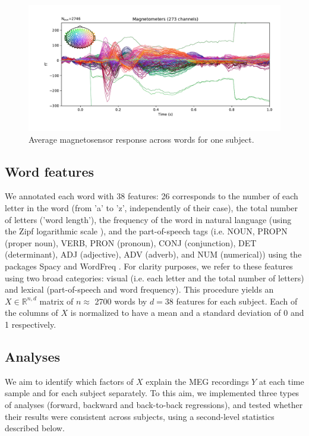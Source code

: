 \begin{figure}
  \centering
  \includegraphics[width=\textwidth, trim=1.5cm 1cm 0.5cm 0cm, clip=True]{figure_meg.pdf}
  \caption{Average magnetosensor response across words for one subject.}
  \label{fig:megavg}
\end{figure}

\subsection{Word features}
We annotated each word with 38 features: 26 corresponds to the number of each letter in the word (from 'a' to 'z', independently of their case), the total number of letters ('word length'), the frequency of the word in natural language (using the Zipf logarithmic scale \cite{marc_brysbaert}), and the part-of-speech tags (i.e. NOUN, PROPN (proper noun), VERB, PRON (pronoun), CONJ (conjunction), DET (determinant), ADJ (adjective), ADV (adverb), and NUM (numerical)) using the packages Spacy \cite{spacy} and WordFreq \cite{speer}. For clarity purposes, we refer to these features using two broad categories: visual (i.e. each letter and the total number of letters) and lexical (part-of-speech and word frequency).
This procedure yields an $X \in \mathbb{R}^{n, d}$ matrix of $n\approx$ 2700 words by $d=38$ features for each subject. Each of the columns of $X$ is normalized to have a mean and a standard deviation of 0 and 1 respectively.

\subsection{Analyses}
We aim to identify which factors of $X$ explain the MEG recordings $Y$ at each time sample and for each subject separately. To this aim, we implemented three types of analyses (forward, backward and back-to-back regressions), and tested whether their results were consistent across subjects, using a second-level statistics described below.

